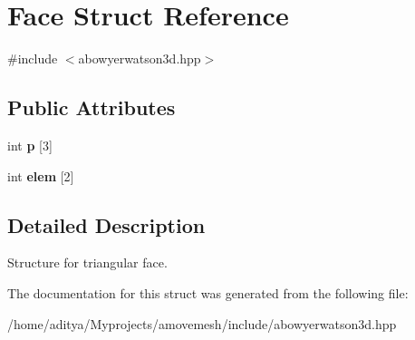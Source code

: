 \hypertarget{structFace}{\section{Face Struct Reference}
\label{structFace}
}


{\ttfamily \#include $<$abowyerwatson3d.\-hpp$>$}

\subsection*{Public Attributes}
\begin{DoxyCompactItemize}
\item 
\hypertarget{structFace_a0a09789ff28af56e91b9fa3ab9b8e82d}{int {\bfseries p} \mbox{[}3\mbox{]}}\label{structFace_a0a09789ff28af56e91b9fa3ab9b8e82d}

\item 
\hypertarget{structFace_a600520d8abadc036ff2100c88293120f}{int {\bfseries elem} \mbox{[}2\mbox{]}}\label{structFace_a600520d8abadc036ff2100c88293120f}

\end{DoxyCompactItemize}


\subsection{Detailed Description}
Structure for triangular face. 

The documentation for this struct was generated from the following file\-:\begin{DoxyCompactItemize}
\item 
/home/aditya/\-Myprojects/amovemesh/include/abowyerwatson3d.\-hpp\end{DoxyCompactItemize}
